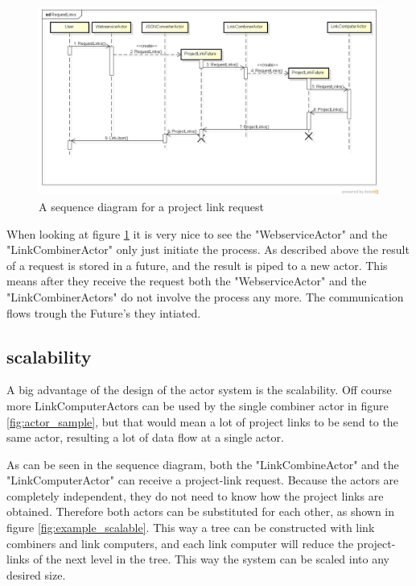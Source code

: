 \documentclass[10pt,a4paper]{article}
\begin{document}
\begin{figure}[htb]
    \centering
    \includegraphics[width=1.0\textwidth]{RequestLinks}
    \caption{A sequence diagram for a project link request}
    \label{fig:actor_seq}
\end{figure}



When looking at figure \ref{fig:actor_seq} it is very nice to see the "WebserviceActor" and the "LinkCombinerActor" only just initiate the process. As described above the result of a request is stored in a future, and the result is piped to a new actor. This means after they receive the request both the "WebserviceActor" and the "LinkCombinerActors" do not involve the process any more. The communication flows trough the Future's they intiated.


\subsection{scalability}

A big advantage of the design of the actor system is the scalability. Off course more LinkComputerActors can be used by the single combiner actor in figure \ref{fig:actor_sample}, but that would mean a lot of project links to be send to the same actor, resulting a lot of data flow at a single actor. 

As can be seen in the sequence diagram, both the "LinkCombineActor" and the "LinkComputerActor" can receive a project-link request. Because the actors are completely independent, they do not need to know how the project links are obtained. Therefore both actors can be substituted for each other, as shown in figure \ref{fig:example_scalable}. This way a tree can be constructed with link combiners and link computers, and each link computer will reduce the project-links of the next level in the tree. This way the system can be scaled into any desired size.
\end{document}
